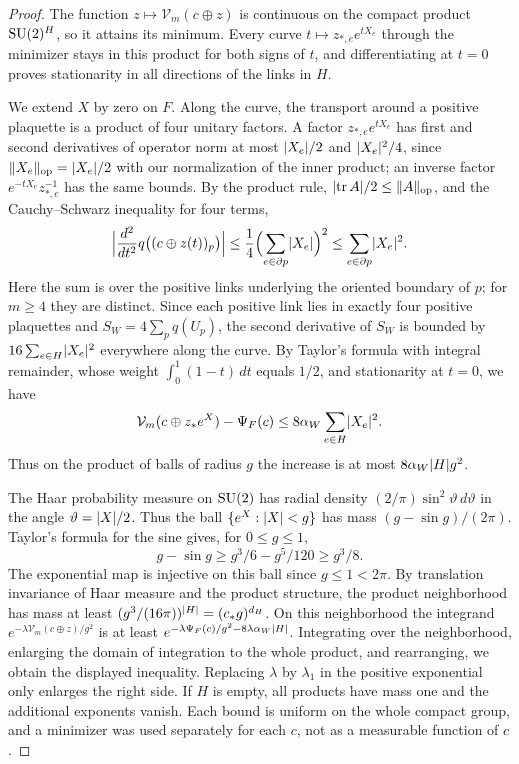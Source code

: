 \begin{proof}
The function $z\mapsto\mathcal V_m(c\oplus z)$ is continuous on the compact product $\mathrm{SU}(2)^H$, so it attains its minimum. Every curve $t\mapsto z_{*,e}e^{tX_e}$ through the minimizer stays in this product for both signs of $t$, and differentiating at $t=0$ proves stationarity in all directions of the links in $H$.

We extend $X$ by zero on $F$. Along the curve, the transport around a positive plaquette is a product of four unitary factors. A factor $z_{*,e}e^{tX_e}$ has first and second derivatives of operator norm at most $\lvert X_e\rvert/2$ and $\lvert X_e\rvert^2/4$, since $\lVert X_e\rVert_{\mathrm{op}}=\lvert X_e\rvert/2$ with our normalization of the inner product; an inverse factor $e^{-tX_e}z_{*,e}^{-1}$ has the same bounds. By the product rule, $\lvert \operatorname{tr} A\rvert/2\le\lVert A\rVert_{\mathrm{op}}$, and the Cauchy--Schwarz inequality for four terms,
\[
 \Bigl\lvert\frac{d^2}{dt^2}q\bigl((c\oplus z(t))_p\bigr)\Bigr\rvert
 \le\frac14\Bigl(\sum_{e\in\partial p}\lvert X_e\rvert\Bigr)^2\le\sum_{e\in\partial p}\lvert X_e\rvert^2.
\]
Here the sum is over the positive links underlying the oriented boundary of $p$; for $m\ge4$ they are distinct. Since each positive link lies in exactly four positive plaquettes and $S_W=4\sum_pq(U_p)$, the second derivative of $S_W$ is bounded by $16\sum_{e\in H}\lvert X_e\rvert^2$ everywhere along the curve. By Taylor's formula with integral remainder, whose weight $\int_0^1(1-t)\,dt$ equals $1/2$, and stationarity at $t=0$, we have
\[
 \mathcal V_m(c\oplus z_*e^X)-\Psi_F(c)\le8\alpha_W\sum_{e\in H}\lvert X_e\rvert^2.
\]
Thus on the product of balls of radius $g$ the increase is at most $8\alpha_W\lvert H\rvert g^2$.

The Haar probability measure on $\mathrm{SU}(2)$ has radial density $(2/\pi)\sin^2\vartheta\,d\vartheta$ in the angle $\vartheta=\lvert X\rvert/2$. Thus the ball $\{e^X:\lvert X\rvert<g\}$ has mass $(g-\sin g)/(2\pi)$. Taylor's formula for the sine gives, for $0\le g\le1$,
\[
 g-\sin g\ge g^3/6-g^5/120\ge g^3/8.
\]
The exponential map is injective on this ball since $g\le1<2\pi$. By translation invariance of Haar measure and the product structure, the product neighborhood has mass at least $(g^3/(16\pi))^{\lvert H\rvert}=(c_*g)^{d_H}$. On this neighborhood the integrand $e^{-\lambda\mathcal V_m(c\oplus z)/g^2}$ is at least $e^{-\lambda\Psi_F(c)/g^2-8\lambda\alpha_W\lvert H\rvert}$. Integrating over the neighborhood, enlarging the domain of integration to the whole product, and rearranging, we obtain the displayed inequality. Replacing $\lambda$ by $\lambda_1$ in the positive exponential only enlarges the right side. If $H$ is empty, all products have mass one and the additional exponents vanish. Each bound is uniform on the whole compact group, and a minimizer was used separately for each $c$, not as a measurable function of $c$.
\end{proof}

